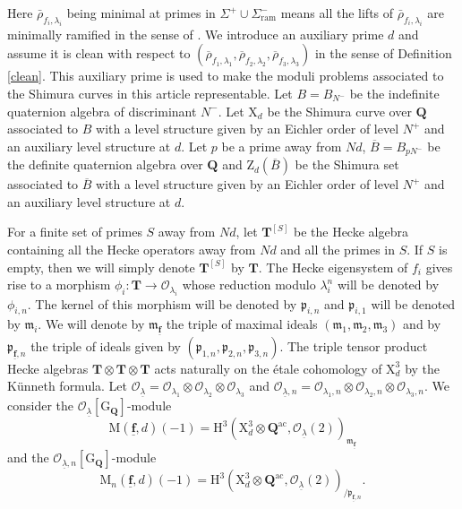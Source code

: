 \documentclass[10pt]{amsart}
\numberwithin{equation}{section}
\theoremstyle{plain}
\numberwithin{equation}{section}
\theoremstyle{definition}
\theoremstyle{remark}
\def\ac{\mathrm{ac}}
\def\frakm{\mathfrak{m}}
\def\Qbar{\QQ^{\ac}}
\def\ac{\mathrm{ac}}
\def\ram{\mathrm{ram}}
\def\undlamb{\underline{\lambda}}
\def\triplef{\underline{\mathbf{f}}}
\def\calO{\mathcal{O}}
\def\frakm{\mathfrak{m}}
\def\frakp{\mathfrak{p}}
\def\QQ{\mathbf{Q}}
\def\TT{\mathbf{T}}
\def\rmG{\mathrm{G}}
\def\rmH{\mathrm{H}}
\def\rmM{\mathrm{M}}
\def\rmX{\mathrm{X}}
\def\rmZ{\mathrm{Z}}
\begin{document}
Here $\bar{\rho}_{f_{i}, \lambda_{i}}$ being minimal at primes in $\Sigma^{+}\cup\Sigma^{-}_{\ram}$ means all the lifts of  $\bar{\rho}_{f_{i}, \lambda_{i}}$ are minimally ramified in the sense of \cite[\S 29]{Maz}. We introduce an auxiliary prime $d$ and assume it is clean with respect to $(\overline{\rho}_{f_{1}, \lambda_{1}}, \overline{\rho}_{f_{2}, \lambda_{2}}, \overline{\rho}_{f_{3}, \lambda_{3}})$ in the sense of Definition \ref{clean}.  This auxiliary prime is used to make the moduli problems associated to the Shimura curves in this article representable. Let $B=B_{N^{-}}$ be the indefinite quaternion algebra of discriminant $N^{-}$. Let $\rmX_{d}$ be the Shimura curve over $\QQ$ associated to $B$ with a level structure given by an Eichler order of level $N^{+}$ and an auxiliary level structure at $d$. Let $p$ be a prime away from $Nd$, $\overline{B}=B_{pN^{-}}$ be the definite quaternion algebra over $\QQ$ and $\rmZ_{d}(\overline{B})$ be the Shimura set associated to $\overline{B}$ with a level structure given by an Eichler order of level $N^{+}$ and an auxiliary level structure at $d$. 

For a finite set of primes $S$ away from $Nd$, let $\TT^{[S]}$ be the Hecke algebra containing all the Hecke operators away from $Nd$ and all the primes in $S$. If $S$ is empty, then we will simply denote $\TT^{[S]}$ by $\TT$. The Hecke eigensystem of $f_{i}$ gives rise to a morphism $\phi_{i}: \TT\rightarrow\calO_{\lambda_{i}}$ whose reduction modulo $\lambda^{n}_{i}$ will be denoted by $\phi_{i, n}$. The kernel of this morphism will be denoted by $\frakp_{i, n}$ and  $\frakp_{i, 1}$ will be denoted by $\frakm_{i}$. We will denote by $\frakm_{\triplef}$ the triple of maximal ideals $(\frakm_{1}, \frakm_{2}, \frakm_{3})$ and by $\frakp_{\triplef,n}$ the triple of ideals given by $(\frakp_{1, n}, \frakp_{2, n}, \frakp_{3, n})$.  The triple tensor product Hecke algebras $\TT\otimes\TT\otimes \TT$  acts naturally on the \'etale cohomology of $\rmX^{3}_{d}$ by the K\"{u}nneth formula. Let $\calO_{\undlamb}=\calO_{{\lambda_{1}}}\otimes \calO_{{\lambda_{2}}}\otimes \calO_{{\lambda_{3}}}$ and $\calO_{\undlamb, n}=\calO_{\lambda_{1}, n}\otimes \calO_{\lambda_{2}, n}\otimes \calO_{\lambda_{3}, n}$.  We consider the $\calO_{\underline{\lambda}}[\rmG_{\QQ}]$-module 
\begin{equation*}
\rmM(\triplef, d)(-1)= \rmH^{3}(\rmX^{3}_{d}\otimes\Qbar, \calO_{\undlamb}(2))_{\frakm_{\triplef}}
\end{equation*}
and the $\calO_{\underline{\lambda}, n}[\rmG_{\QQ}]$-module
\begin{equation*}
\rmM_{n}(\triplef, d)(-1) = \rmH^{3}(\rmX^{3}_{d}\otimes {\Qbar}, \calO_{\undlamb}(2))_{/\frakp_{\triplef, n}}.
\end{equation*}
\end{document}
